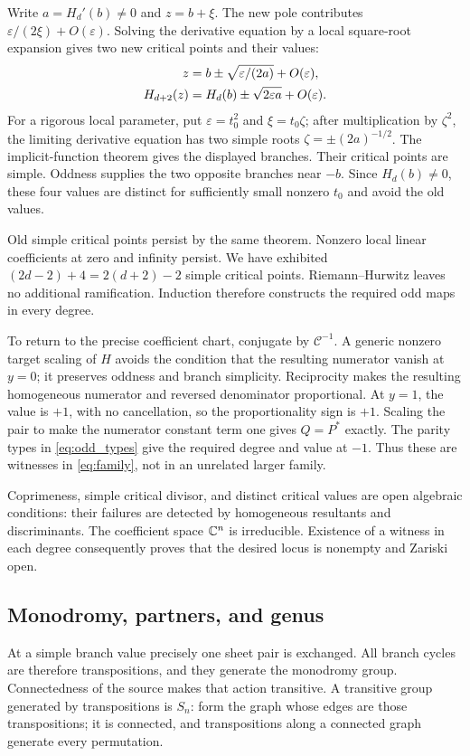 Write \(a=H_d'(b)\ne0\) and \(z=b+\xi\). The new pole contributes \(\varepsilon/(2\xi)+O(\varepsilon)\). Solving the derivative equation by a local square-root expansion gives two new critical points and their values:
\begin{align}\label{eq:local_insertion}
 z&=b\pm\sqrt{\varepsilon/(2a)}+O(\varepsilon),\notag\\
 H_{d+2}(z)&=H_d(b)\pm\sqrt{2\varepsilon a}+O(\varepsilon).
\end{align}
For a rigorous local parameter, put \(\varepsilon=t_0^2\) and \(\xi=t_0\zeta\); after multiplication by \(\zeta^2\), the limiting derivative equation has two simple roots \(\zeta=\pm(2a)^{-1/2}\). The implicit-function theorem gives the displayed branches. Their critical points are simple. Oddness supplies the two opposite branches near \(-b\). Since \(H_d(b)\ne0\), these four values are distinct for sufficiently small nonzero \(t_0\) and avoid the old values.

Old simple critical points persist by the same theorem. Nonzero local linear coefficients at zero and infinity persist. We have exhibited
\((2d-2)+4=2(d+2)-2\) simple critical points. Riemann--Hurwitz leaves no additional ramification. Induction therefore constructs the required odd maps in every degree.

To return to the precise coefficient chart, conjugate by \(\mathcal C^{-1}\). A generic nonzero target scaling of \(H\) avoids the condition that the resulting numerator vanish at \(y=0\); it preserves oddness and branch simplicity. Reciprocity makes the resulting homogeneous numerator and reversed denominator proportional. At \(y=1\), the value is \(+1\), with no cancellation, so the proportionality sign is \(+1\). Scaling the pair to make the numerator constant term one gives \(Q=P^*\) exactly. The parity types in \eqref{eq:odd_types} give the required degree and value at \(-1\). Thus these are witnesses in \eqref{eq:family}, not in an unrelated larger family.

Coprimeness, simple critical divisor, and distinct critical values are open algebraic conditions: their failures are detected by homogeneous resultants and discriminants. The coefficient space \(\mathbb C^n\) is irreducible. Existence of a witness in each degree consequently proves that the desired locus is nonempty and Zariski open.

\subsection{Monodromy, partners, and genus}
At a simple branch value precisely one sheet pair is exchanged. All branch cycles are therefore transpositions, and they generate the monodromy group. Connectedness of the source makes that action transitive. A transitive group generated by transpositions is \(S_n\): form the graph whose edges are those transpositions; it is connected, and transpositions along a connected graph generate every permutation.

